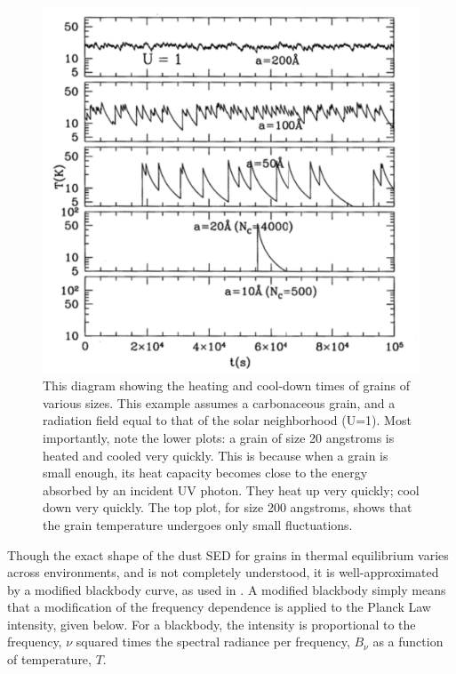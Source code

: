 \begin{figure}[htbp]
\begin{center}
\includegraphics[width=150mm]{EPS/one-photon_heating.pdf}
\caption{
This diagram \cite{draine11} showing the heating and cool-down times of grains of various sizes. This example assumes a carbonaceous grain, and a radiation field equal to that of the solar neighborhood (U=1). Most importantly, note the lower plots: a grain of size 20 angstroms is heated and cooled very quickly. This is because when a grain is small enough, its heat capacity becomes close to the energy absorbed by an incident UV photon. They heat up very quickly; cool down very quickly. The top plot, for size 200 angstroms, shows that the grain temperature undergoes only small fluctuations.
 }
\label{Transient heating of small grains}
\end{center}
\end{figure}
Though the exact shape of the dust SED for grains in thermal equilibrium varies across environments, and is not completely understood, it is well-approximated by a modified blackbody curve, as used in \cite{onaka99}. A modified blackbody simply means that a modification of the frequency dependence is applied to the Planck Law intensity, given below. For a blackbody, the intensity is proportional to the frequency, $\nu$ squared times the spectral radiance  per frequency, $B_\nu$ as a function of temperature, $T$.
